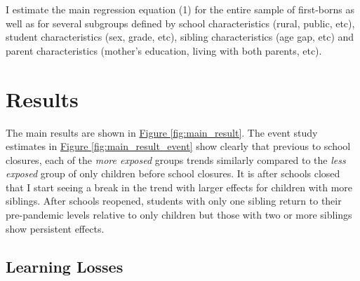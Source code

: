 
I estimate the main regression equation (1) for the entire sample of first-borns as well as for several subgroups defined by school characteristics (rural, public, etc), student characteristics (sex, grade, etc), sibling characteristics (age gap, etc) and parent characteristics (mother's education, living with both parents, etc).


\section{Results}\label{sec:results}

The main results are shown in \hyperref[fig:main_result]{Figure \ref{fig:main_result}}. The event study estimates in \hyperref[fig:main_result_event]{Figure \ref{fig:main_result_event}} show clearly that previous to school closures, each of the \textit{more exposed} groups trends similarly compared to the \textit{less exposed} group of only children before school closures. It is after schools closed that I start seeing a break in the trend with larger effects for children with more siblings. After schools reopened, students with only one sibling return to their pre-pandemic levels relative to only children but those with two or more siblings show persistent effects.

\subsection{Learning Losses}

